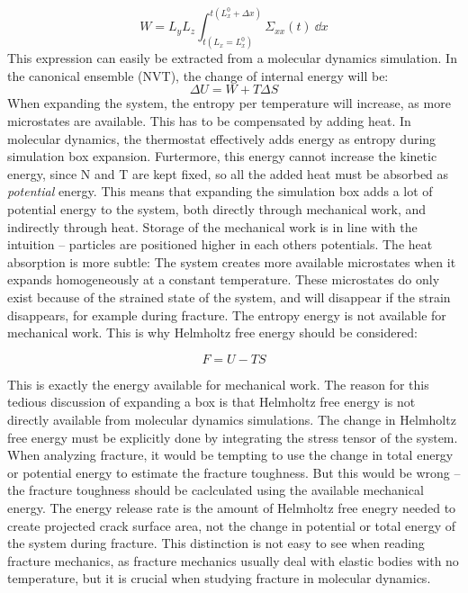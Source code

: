 \begin{equation}
	W = L_y L_z \int_{t(L_x = L_x^0)}^{t(L_x^0 + \Delta x)} \Sigma_{xx}(t) \ \dd x
	\label{eq:work_expansion}
\end{equation}
This expression can easily be extracted from a molecular dynamics simulation.
In the canonical ensemble (NVT), the change of internal energy will be:
\begin{equation}
	\Delta U = W + T\Delta S
\end{equation}
When expanding the system, the entropy per temperature will increase, as more microstates are available. This has to be compensated by adding heat. In molecular dynamics, the thermostat effectively adds energy as entropy during simulation box expansion. Furtermore, this energy cannot increase the kinetic energy, since N and T are kept fixed, so all the added heat must be absorbed as \emph{potential} energy. This means that expanding the simulation box adds a lot of potential energy to the system, both directly through mechanical work, and indirectly through heat. Storage of the mechanical work is in line with the intuition -- particles are positioned higher in each others potentials. The heat absorption is more subtle: The system creates more available microstates when it expands homogeneously at a constant temperature. These microstates do only exist because of the strained state of the system, and will disappear if the strain disappears, for example during fracture. The entropy energy is not available for mechanical work. This is why Helmholtz free energy should be considered:

\begin{equation}
	F = U - TS
\end{equation}

This is exactly the energy available for mechanical work. The reason for this tedious discussion of expanding a box is that Helmholtz free energy is not directly available from molecular dynamics simulations. The change in Helmholtz free energy must be explicitly done by integrating the stress tensor of the system. When analyzing fracture, it would be tempting to use the change in total energy or potential energy to estimate the fracture toughness. But this would be wrong -- the fracture toughness should be caclculated using the available mechanical energy. The energy release rate is the amount of Helmholtz free enegry needed to create projected crack surface area, not the change in potential or total energy of the system during fracture. This distinction is not easy to see when reading fracture mechanics, as fracture mechanics usually deal with elastic bodies with no temperature, but it is crucial when studying fracture in molecular dynamics.

